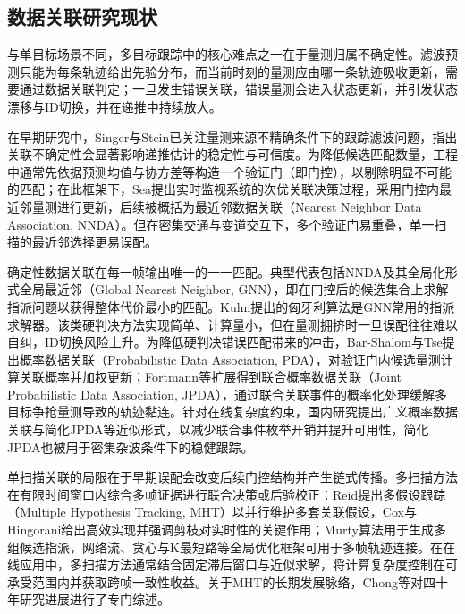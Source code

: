 \documentclass{xdupgthesis}
\begin{document}
\subsection{数据关联研究现状}
与单目标场景不同，多目标跟踪中的核心难点之一在于量测归属不确定性。滤波预测只能为每条轨迹给出先验分布，而当前时刻的量测应由哪一条轨迹吸收更新，需要通过数据关联判定；一旦发生错误关联，错误量测会进入状态更新，并引发状态漂移与ID切换，并在递推中持续放大\cite{barshalomli1995multitarget}。

在早期研究中，Singer与Stein已关注量测来源不精确条件下的跟踪滤波问题，指出关联不确定性会显著影响递推估计的稳定性与可信度\cite{singer1971optimaltracking}。为降低候选匹配数量，工程中通常先依据预测均值与协方差等构造一个验证门（即门控），以剔除明显不可能的匹配；在此框架下，Sea提出实时监视系统的次优关联决策过程，采用门控内最近邻量测进行更新，后续被概括为最近邻数据关联（Nearest Neighbor Data Association, NNDA）\cite{sea1971suboptimal}。但在密集交通与变道交互下，多个验证门易重叠，单一扫描的最近邻选择更易误配。

确定性数据关联在每一帧输出唯一的一一匹配。典型代表包括NNDA及其全局化形式全局最近邻（Global Nearest Neighbor, GNN），即在门控后的候选集合上求解指派问题以获得整体代价最小的匹配。Kuhn提出的匈牙利算法是GNN常用的指派求解器\cite{kuhn1955hungarian}。该类硬判决方法实现简单、计算量小，但在量测拥挤时一旦误配往往难以自纠，ID切换风险上升。为降低硬判决错误匹配带来的冲击，Bar-Shalom与Tse提出概率数据关联（Probabilistic Data Association, PDA），对验证门内候选量测计算关联概率并加权更新\cite{barshalom1975pda}；Fortmann等扩展得到联合概率数据关联（Joint Probabilistic Data Association, JPDA），通过联合关联事件的概率化处理缓解多目标争抢量测导致的轨迹黏连\cite{fortmann1983jpda}。针对在线复杂度约束，国内研究提出广义概率数据关联与简化JPDA等近似形式，以减少联合事件枚举开销并提升可用性\cite{pan2005gpda,qin2005simplifiedjpda}，简化JPDA也被用于密集杂波条件下的稳健跟踪\cite{sheng2020simplifiedjpda}。

单扫描关联的局限在于早期误配会改变后续门控结构并产生链式传播。多扫描方法在有限时间窗口内综合多帧证据进行联合决策或后验校正：Reid提出多假设跟踪（Multiple Hypothesis Tracking, MHT）以并行维护多套关联假设\cite{reid1979mht}，Cox与Hingorani给出高效实现并强调剪枝对实时性的关键作用\cite{cox1996efficientmht}；Murty算法用于生成多组候选指派\cite{murty1968ranking}，网络流、贪心与K最短路等全局优化框架可用于多帧轨迹连接\cite{zhang2008networkflow,pirsiavash2011greedy,berclaz2011kshortest}。在在线应用中，多扫描方法通常结合固定滞后窗口与近似求解，将计算复杂度控制在可承受范围内并获取跨帧一致性收益。关于MHT的长期发展脉络，Chong等对四十年研究进展进行了专门综述\cite{chong2019forty}。
\end{document}
